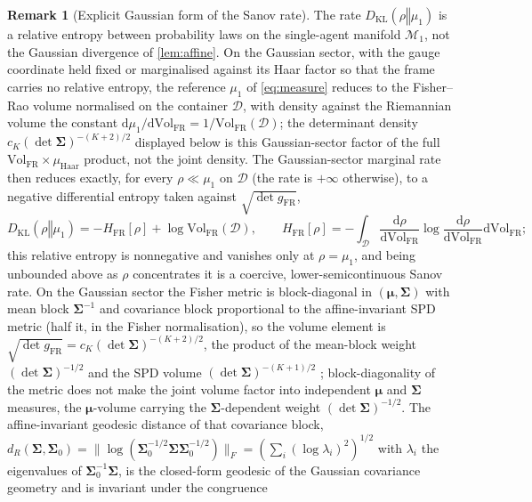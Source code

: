 \documentclass[11pt]{article}
\theoremstyle{plain}
\theoremstyle{definition}
\newtheorem{remark}{Remark}[section]
\newcommand{\KL}[2]{D_{\mathrm{KL}}\mathopen{}\left(#1 \mathbin{\Vert} #2\right)\mathclose{}}
\newcommand{\dd}{\mathrm{d}}
\newcommand{\bmu}{\boldsymbol{\mu}}
\newcommand{\bSigma}{\boldsymbol{\Sigma}}
\newcommand{\Dcal}{\mathcal{D}}
\newcommand{\Mcal}{\mathcal{M}}
\begin{document}
\begin{remark}[Explicit Gaussian form of the Sanov rate]
\label{rem:gaussianrate}
The rate $\KL{\rho}{\mu_1}$ is a relative entropy between probability laws on the
single-agent manifold $\Mcal_1$, not the Gaussian divergence of \cref{lem:affine}. On the Gaussian sector, with the gauge coordinate held fixed or marginalised against its Haar
factor so that the frame carries no relative entropy, the reference $\mu_1$ of \cref{eq:measure}
reduces to the Fisher--Rao volume normalised on the container $\Dcal$, with density against the
Riemannian volume the constant
$\dd\mu_1/\dd\mathrm{Vol}_{\mathrm{FR}}=1/\mathrm{Vol}_{\mathrm{FR}}(\Dcal)$; the determinant
density $c_K(\det\bSigma)^{-(K+2)/2}$ displayed below is this Gaussian-sector factor of the full
$\mathrm{Vol}_{\mathrm{FR}}\times\mu_{\mathrm{Haar}}$ product, not the joint density. The
Gaussian-sector marginal rate then reduces exactly, for every $\rho\ll\mu_1$ on $\Dcal$ (the rate
is $+\infty$ otherwise), to a negative differential entropy
taken against $\sqrt{\det g_{\mathrm{FR}}}$,
\begin{equation}
\label{eq:rateentropy}
\KL{\rho}{\mu_1}=-H_{\mathrm{FR}}[\rho]+\log\mathrm{Vol}_{\mathrm{FR}}(\Dcal),
\qquad
H_{\mathrm{FR}}[\rho]=-\int_{\Dcal}\frac{\dd\rho}{\dd\mathrm{Vol}_{\mathrm{FR}}}\log\frac{\dd\rho}{\dd\mathrm{Vol}_{\mathrm{FR}}}\dd\mathrm{Vol}_{\mathrm{FR}};
\end{equation}
this relative entropy is nonnegative and vanishes only at $\rho=\mu_1$, and being unbounded
above as $\rho$ concentrates it is a coercive, lower-semicontinuous Sanov rate. On the
Gaussian sector the Fisher metric is block-diagonal in $(\bmu,\bSigma)$ with mean block
$\bSigma^{-1}$ and covariance block proportional to the affine-invariant SPD metric (half it, in the Fisher normalisation), so the volume element
is $\sqrt{\det g_{\mathrm{FR}}}=c_K(\det\bSigma)^{-(K+2)/2}$, the product of the mean-block
weight $(\det\bSigma)^{-1/2}$ and the SPD volume $(\det\bSigma)^{-(K+1)/2}$
\citep{skovgaard1984riemannian,amari2000methods}; block-diagonality of the metric does not
make the joint volume factor into independent $\bmu$ and $\bSigma$ measures, the
$\bmu$-volume carrying the $\bSigma$-dependent weight $(\det\bSigma)^{-1/2}$. The
affine-invariant geodesic distance of that covariance block,
$d_R(\bSigma,\bSigma_0)=\lVert\log(\bSigma_0^{-1/2}\bSigma\bSigma_0^{-1/2})\rVert_F=(\sum_i(\log\lambda_i)^2)^{1/2}$
with $\lambda_i$ the eigenvalues of $\bSigma_0^{-1}\bSigma$, is the closed-form geodesic of
the Gaussian covariance geometry and is invariant under the congruence

\end{remark}
\end{document}
